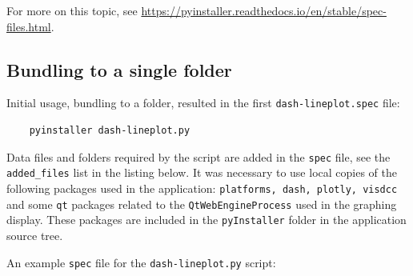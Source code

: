 For more on this topic, see \url{https://pyinstaller.readthedocs.io/en/stable/spec-files.html}.

\subsection{Bundling to a single folder}
\label{sec:bundledFolder}

Initial usage, bundling to a folder, resulted in the first \texttt{dash-lineplot.spec} file:

\footnotesize
\begin{lstlisting}
    pyinstaller dash-lineplot.py
\end{lstlisting}
\normalsize

Data files and folders required by the script are added in the \texttt{spec} file, see the \texttt{added\_files} list in the listing below. It was necessary to use local copies of the following packages used in the application: \texttt{platforms, dash, plotly, visdcc} and some \texttt{qt} packages related to the \texttt{QtWebEngineProcess} used in the graphing display. These packages are included in the \texttt{pyInstaller} folder in the application source tree.

An example \texttt{spec} file for the \texttt{dash-lineplot.py} script:

